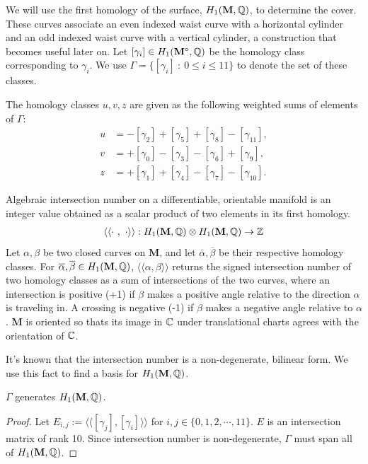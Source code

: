\documentclass[a4paper, 11pt]{article}
\def\bM{\mathbf{M}}
\def\bMs{\mathbf{M}^\circ}
\def\<{\langle} \def\>{\rangle}
\begin{document}
We will use the first homology of the surface, $H_1(\bM,\QQ)$, to determine the cover. These curves associate an even indexed waist curve with a horizontal cylinder and an odd indexed waist curve with a vertical cylinder, a construction that becomes useful later on. Let $[\gamma_i]\in H_1(\bMs,\QQ)$ be the homology class corresponding to $\gamma_i$. We use $\Gamma=\{[\gamma_i]~:~0\leq i \leq 11\}$ to denote the set of these classes.

\begin{Def}
The homology classes $u,v,z$ are given as the following weighted sums of elements of $\Gamma$:
\begin{align*}
u &= -[\gamma_2] +[\gamma_5] + [\gamma_8] - [\gamma_{11}],\\
v &= +[\gamma_0] -[\gamma_3] -[\gamma_6] +[\gamma_9],\\
z &= +[\gamma_1] +[\gamma_4]-[\gamma_7]-[\gamma_{10}].
\end{align*}
\end{Def}

\begin{Def}
Algebraic intersection number on a differentiable, orientable manifold is an integer value obtained as a scalar product of two elements in its first homology.
\begin{align*}
\<\<\cdot~,~\cdot\>\>:H_1(\bM,\QQ)\otimes H_1(\bM,\QQ)\rightarrow\ZZ
\end{align*}
Let $\alpha,\beta$ be two closed curves on $\bM$, and let $\overline{\alpha},\overline{\beta}$ be their respective homology classes. For $\overline{\alpha},\overline{\beta}\in H_1(\mathbf{M},\mathbb{Q})$, $\<\<\alpha,\beta\>\>$ returns the signed intersection number of two homology classes as a sum of intersections of the two curves, where  an intersection is positive (+1) if $\beta$ makes a positive angle relative to the direction $\alpha$ is traveling in. A crossing is negative (-1) if $\beta$ makes a negative angle relative to $\alpha$. $\bM$ is oriented so thats its image in $\mathbb{C}$ under translational charts agrees with the orientation of $\mathbb{C}$.
\end{Def}

It's known that the intersection number is a non-degenerate, bilinear form. We use this fact to find a basis for $H_1(\bM,\QQ)$.

\begin{lem}
$\Gamma$ generates $H_1(\bM,\QQ)$.
\begin{proof}
Let $E_{i,j}:=\<\<[\gamma_j],[\gamma_i]\>\>$ for $i,j\in \{0,1,2,\cdots,11 \}$. $E$ is an intersection matrix of rank 10. Since intersection number is non-degenerate, $\Gamma$ must span all of $H_1(\bM,\QQ)$.
\end{proof}
\end{lem}
\end{document}
